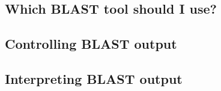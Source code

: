 \documentclass[table]{beamer}
\begin{document}
    \subsection{Which BLAST tool should I use?}
    \begin{frame}
     \frametitle{}
    \end{frame}

    \subsection{Controlling BLAST output}
    \begin{frame}
     \frametitle{}
    \end{frame}
     
    \subsection{Interpreting BLAST output}
    \begin{frame}
     \frametitle{}
    \end{frame}
    
\end{document}
